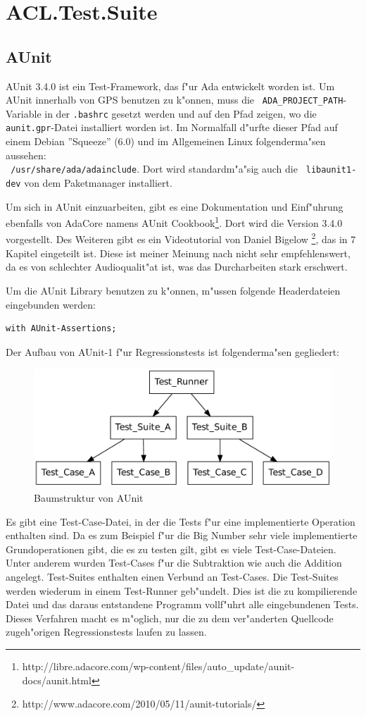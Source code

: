 \chapter{ACL.Test.Suite}
\section{AUnit} 
AUnit 3.4.0 ist ein Test-Framework, das f"ur Ada entwickelt worden
ist.  Um AUnit innerhalb von GPS benutzen zu k"onnen, muss die {\tt
  ADA\_PROJECT\_PATH}-Variable in der {\tt .bashrc} gesetzt werden und
auf den Pfad zeigen, wo die {\tt aunit.gpr}-Datei installiert worden
ist.  Im Normalfall d"urfte dieser Pfad auf einem Debian ''Squeeze''
(6.0) und im Allgemeinen Linux folgenderma"sen aussehen: \\{\tt
  /usr/share/ada/adainclude}.  Dort wird standardm"a"sig auch die {\tt
  libaunit1-dev} von dem Paketmanager installiert.

Um sich in AUnit einzuarbeiten, gibt es eine Dokumentation und
Einf"uhrung ebenfalls von AdaCore namens AUnit
Cookbook\footnote{http://libre.adacore.com/wp-content/files/auto\_update/aunit-docs/aunit.html}.
Dort wird die Version 3.4.0 vorgestellt.  Des Weiteren gibt es ein
Videotutorial von Daniel Bigelow
\footnote{http://www.adacore.com/2010/05/11/aunit-tutorials/}, das in
7 Kapitel eingeteilt ist. Diese ist meiner Meinung nach nicht sehr
empfehlenswert, da es von schlechter Audioqualit"at ist, was das
Durcharbeiten stark erschwert.

Um die AUnit Library benutzen zu k"onnen, m"ussen folgende
Headerdateien eingebunden werden:
\begin{lstlisting}
with AUnit-Assertions; 
\end{lstlisting}
Der Aufbau von AUnit-1 f"ur Regressionstests ist folgenderma"sen gegliedert:
\begin{figure}[t]
  \centering
  \includegraphics[width=\textwidth]{./images/graph_aunit}
  \caption{Baumstruktur von AUnit}
\end{figure}
Es gibt eine Test-Case-Datei, in der die Tests f"ur eine
implementierte Operation enthalten sind.  Da es zum Beispiel f"ur die
Big Number sehr viele implementierte Grundoperationen gibt, die es zu
testen gilt, gibt es viele Test-Case-Dateien.  Unter anderem wurden
Test-Cases f"ur die Subtraktion wie auch die Addition angelegt.
Test-Suites enthalten einen Verbund an Test-Cases.  Die Test-Suites
werden wiederum in einem Test-Runner geb"undelt.  Dies ist die zu
kompilierende Datei und das daraus entstandene Programm vollf"uhrt
alle eingebundenen Tests.  Dieses Verfahren macht es m"oglich, nur
die zu dem ver"anderten Quellcode zugeh"origen Regressionstests laufen
zu lassen.

